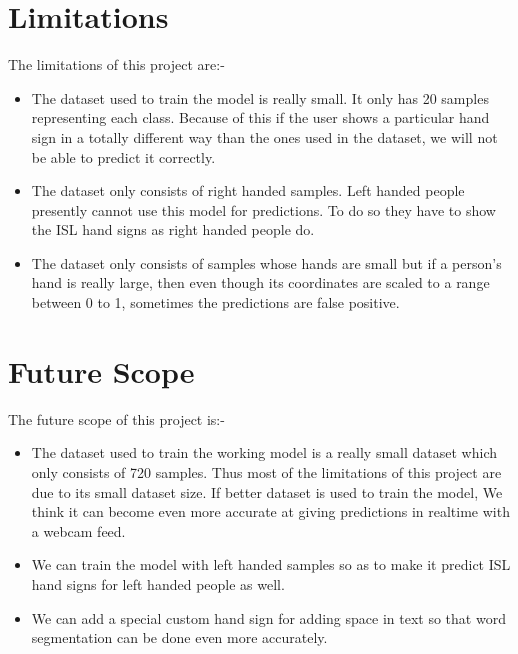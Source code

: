 \documentclass[12pt,a4paper]{report}
\begin{document}
\section{Limitations}
The limitations of this project are:-
\begin{itemize}
	\item The dataset used to train the model is really small. It only has 20 samples representing each class. Because of this if the user shows a particular hand sign in a totally different way than the ones used in the dataset, we will not be able to predict it correctly.
	\item The dataset only consists of right handed samples. Left handed people presently cannot use this model for predictions. To do so they have to show the ISL hand signs as right handed people do.
	\item The dataset only consists of samples whose hands are small but if a person's hand is really large, then even though its coordinates are scaled to a range between 0 to 1, sometimes the predictions are false positive.
\end{itemize}


\section{Future Scope}
The future scope of this project is:-
\begin{itemize}
	\item The dataset used to train the working model is a really small dataset which only consists of 720 samples. Thus most of the limitations of this project are due to its small dataset size. If better dataset is used to train the model, We think it can become even more accurate at giving predictions in realtime with a webcam feed.
	\item We can train the model with left handed samples so as to make it predict ISL hand signs for left handed people as well.
	\item We can add a special custom hand sign for adding space in text so that word segmentation can be done even more accurately.
\end{itemize}
\end{document}
